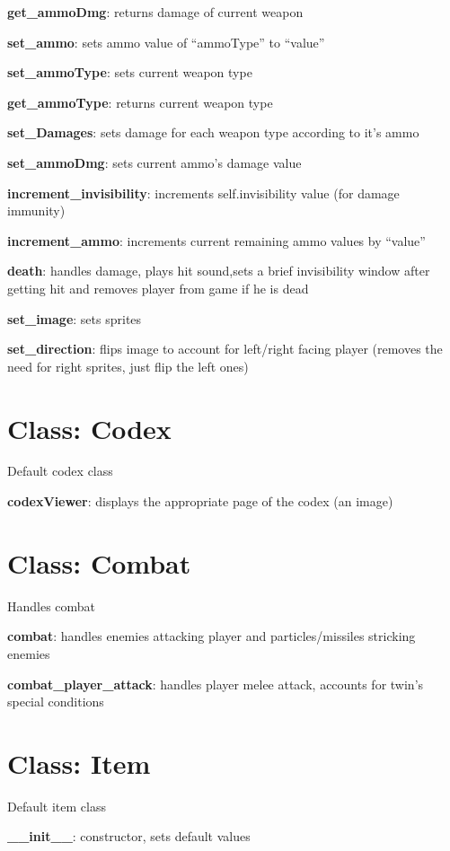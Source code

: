 \documentclass{article}
\begin{document}
\textbf{get\_ammoDmg}: returns damage of current weapon

\textbf{set\_ammo}: sets ammo value of “ammoType” to “value”

\textbf{set\_ammoType}: sets current weapon type

\textbf{get\_ammoType}: returns current weapon type

\textbf{set\_Damages}: sets damage for each weapon type according to it's ammo 

\textbf{set\_ammoDmg}: sets current ammo's damage value

\textbf{increment\_invisibility}: increments self.invisibility value (for damage immunity)

\textbf{increment\_ammo}: increments current remaining ammo values by “value”

\textbf{death}: handles damage, plays hit sound,sets a brief invisibility window after getting hit and removes player from game if he is dead

\textbf{set\_image}: sets sprites

\textbf{set\_direction}: flips image to account for left/right facing player (removes  the need for right sprites, just flip the left ones)

\section{Class: Codex}

Default codex class

\textbf{codexViewer}: displays the appropriate page of the codex (an image)

\section{Class: Combat}

Handles combat

\textbf{combat}: handles enemies attacking player and particles/missiles stricking enemies

\textbf{combat\_player\_attack}: handles player melee attack, accounts for twin's special conditions



\section{Class: Item}

Default item class

\textbf{\_\_init\_\_}: constructor, sets default values
\end{document}
